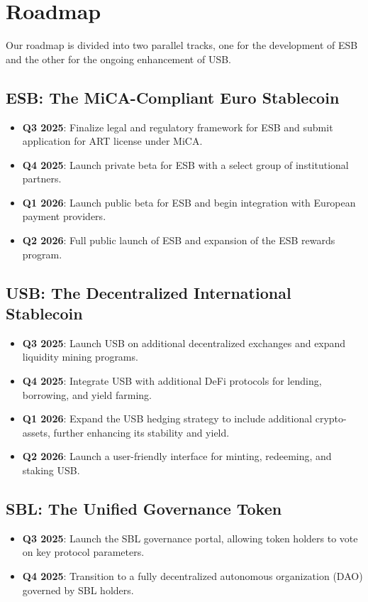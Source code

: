 \section{Roadmap}
Our roadmap is divided into two parallel tracks, one for the development of ESB and the other for the ongoing enhancement of USB.

\subsection{ESB: The MiCA-Compliant Euro Stablecoin}
\begin{itemize}
    \item \textbf{Q3 2025}: Finalize legal and regulatory framework for ESB and submit application for ART license under MiCA.
    \item \textbf{Q4 2025}: Launch private beta for ESB with a select group of institutional partners.
    \item \textbf{Q1 2026}: Launch public beta for ESB and begin integration with European payment providers.
    \item \textbf{Q2 2026}: Full public launch of ESB and expansion of the ESB rewards program.
\end{itemize}

\subsection{USB: The Decentralized International Stablecoin}
\begin{itemize}
    \item \textbf{Q3 2025}: Launch USB on additional decentralized exchanges and expand liquidity mining programs.
    \item \textbf{Q4 2025}: Integrate USB with additional DeFi protocols for lending, borrowing, and yield farming.
    \item \textbf{Q1 2026}: Expand the USB hedging strategy to include additional crypto-assets, further enhancing its stability and yield.
    \item \textbf{Q2 2026}: Launch a user-friendly interface for minting, redeeming, and staking USB.
\end{itemize}

\subsection{SBL: The Unified Governance Token}
\begin{itemize}
    \item \textbf{Q3 2025}: Launch the SBL governance portal, allowing token holders to vote on key protocol parameters.
    \item \textbf{Q4 2025}: Transition to a fully decentralized autonomous organization (DAO) governed by SBL holders.
\end{itemize}  
